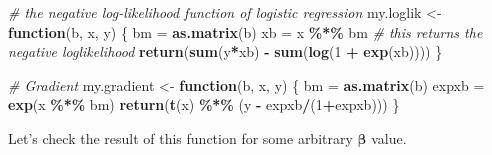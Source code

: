 \documentclass[
]{book}
\newenvironment{Shaded}{\begin{snugshade}}{\end{snugshade}}
\newcommand{\CommentTok}[1]{\textcolor[rgb]{0.56,0.35,0.01}{\textit{#1}}}
\newcommand{\ControlFlowTok}[1]{\textcolor[rgb]{0.13,0.29,0.53}{\textbf{#1}}}
\newcommand{\DecValTok}[1]{\textcolor[rgb]{0.00,0.00,0.81}{#1}}
\newcommand{\DocumentationTok}[1]{\textcolor[rgb]{0.56,0.35,0.01}{\textbf{\textit{#1}}}}
\newcommand{\FunctionTok}[1]{\textcolor[rgb]{0.13,0.29,0.53}{\textbf{#1}}}
\newcommand{\NormalTok}[1]{#1}
\newcommand{\OtherTok}[1]{\textcolor[rgb]{0.56,0.35,0.01}{#1}}
\newcommand{\SpecialCharTok}[1]{\textcolor[rgb]{0.81,0.36,0.00}{\textbf{#1}}}
\newcommand{\StringTok}[1]{\textcolor[rgb]{0.31,0.60,0.02}{#1}}
\theoremstyle{definition}
\theoremstyle{definition}
\theoremstyle{definition}
\theoremstyle{definition}
\theoremstyle{remark}
\begin{document}
\begin{Shaded}
\begin{Highlighting}[]
    \CommentTok{\# the negative log{-}likelihood function of logistic regression }
\NormalTok{    my.loglik }\OtherTok{\textless{}{-}} \ControlFlowTok{function}\NormalTok{(b, x, y)}
\NormalTok{    \{}
\NormalTok{        bm }\OtherTok{=} \FunctionTok{as.matrix}\NormalTok{(b)}
\NormalTok{        xb }\OtherTok{=}\NormalTok{  x }\SpecialCharTok{\%*\%}\NormalTok{ bm}
        \CommentTok{\# this returns the negative loglikelihood}
        \FunctionTok{return}\NormalTok{(}\FunctionTok{sum}\NormalTok{(y}\SpecialCharTok{*}\NormalTok{xb) }\SpecialCharTok{{-}} \FunctionTok{sum}\NormalTok{(}\FunctionTok{log}\NormalTok{(}\DecValTok{1} \SpecialCharTok{+} \FunctionTok{exp}\NormalTok{(xb))))}
\NormalTok{    \}}

    \CommentTok{\# Gradient}
\NormalTok{    my.gradient }\OtherTok{\textless{}{-}} \ControlFlowTok{function}\NormalTok{(b, x, y)}
\NormalTok{    \{}
\NormalTok{        bm }\OtherTok{=} \FunctionTok{as.matrix}\NormalTok{(b) }
\NormalTok{        expxb }\OtherTok{=}  \FunctionTok{exp}\NormalTok{(x }\SpecialCharTok{\%*\%}\NormalTok{ bm)}
        \FunctionTok{return}\NormalTok{(}\FunctionTok{t}\NormalTok{(x) }\SpecialCharTok{\%*\%}\NormalTok{ (y }\SpecialCharTok{{-}}\NormalTok{ expxb}\SpecialCharTok{/}\NormalTok{(}\DecValTok{1}\SpecialCharTok{+}\NormalTok{expxb)))}
\NormalTok{    \}}
\end{Highlighting}
\end{Shaded}

Let's check the result of this function for some arbitrary \(\boldsymbol \beta\) value.

\begin{Shaded}
\end{Shaded}
\end{document}
